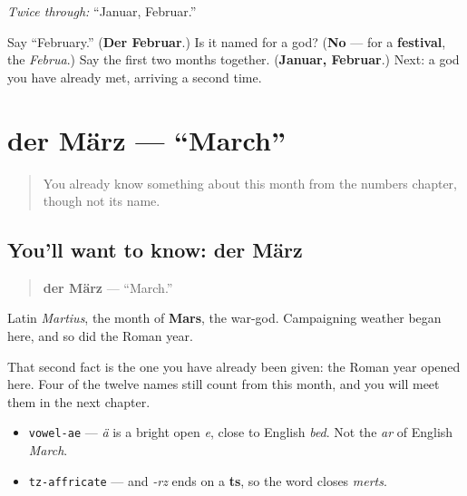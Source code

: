 \emph{Twice through:} \textquotedblleft{}Januar, Februar.\textquotedblright{}

\begin{tcolorbox}[breakable,colback=teal!4,colframe=teal!35!black,title={Before you move on}]
Say \textquotedblleft{}February.\textquotedblright{} (\textbf{Der Februar}.) Is it named for a god? (\textbf{No} — for a \textbf{festival}, the \emph{Februa}.) Say the first two months together. (\textbf{Januar, Februar}.) Next: a god you have already met, arriving a second time.
\end{tcolorbox}
\section[der März]{der März — \textquotedblleft{}March\textquotedblright{}}

\label{lesson:GE-C09-maerz}



\begin{quote}
You already know something about this month from the numbers chapter, though not its name.
\end{quote}

\subsection*{You'll want to know: der März}
\begin{quote}
\textbf{der März} — \textquotedblleft{}March.\textquotedblright{}
\end{quote}

Latin \emph{Martius}, the month of \textbf{Mars}, the war-god. Campaigning weather began here, and so did the Roman year.

That second fact is the one you have already been given: the Roman year opened here. Four of the twelve names still count from this month, and you will meet them in the next chapter.

\begin{sounds}
\begin{itemize}
\raggedright
  \item \texttt{vowel-ae} — \emph{ä} is a bright open \emph{e}, close to English \emph{bed}. Not the \emph{ar} of English \emph{March}.
  \item \texttt{tz-affricate} — and \emph{-rz} ends on a \textbf{ts}, so the word closes \emph{merts}.
\end{itemize}
\end{sounds}

